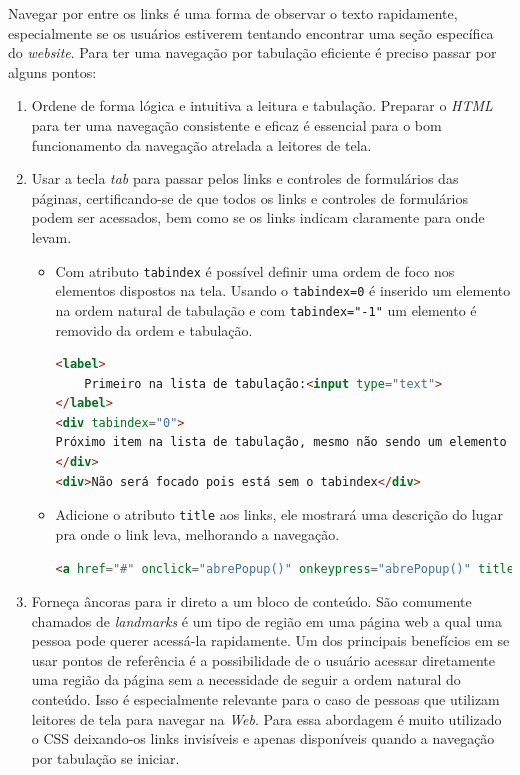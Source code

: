 {{{Navegar por entre os links é uma forma de observar o texto rapidamente, especialmente se os usuários estiverem tentando encontrar uma seção específica do \textit{website}. Para ter uma navegação por tabulação eficiente é preciso passar por alguns pontos: 
\begin{enumerate}
    \item Ordene de forma lógica e intuitiva a leitura e tabulação. Preparar o \textit{HTML}\cite{HTML} para ter uma navegação consistente e eficaz é essencial para o bom funcionamento da navegação atrelada a leitores de tela. 
    \item Usar a tecla \textit{tab} para passar pelos links e controles de formulários
    das páginas, certificando-se de que todos os links e controles de
    formulários podem ser acessados, bem como se os links indicam
    claramente para onde levam. 
    \begin{itemize}
        \item Com atributo \lstinline{tabindex} é possível definir uma ordem de foco nos elementos dispostos na tela. Usando o \lstinline{tabindex=0} é inserido um elemento na ordem natural de tabulação e com \lstinline{tabindex="-1"} um elemento é removido da ordem e tabulação.
        \newpage
{\begin{lstlisting}[language=html,caption=Uso do atributo tabindex]
<label>
    Primeiro na lista de tabulação:<input type="text">
</label>
<div tabindex="0">
Próximo item na lista de tabulação, mesmo não sendo um elemento que receberia o foco natural
</div>
<div>Não será focado pois está sem o tabindex</div>
\end{lstlisting}}
        \item Adicione o atributo \lstinline{title} aos links, ele mostrará uma descrição do lugar pra onde o link leva, melhorando a navegação.
{\begin{lstlisting}[language=html,caption=usando o atributo title]
<a href="#" onclick="abrePopup()" onkeypress="abrePopup()" title="Abre uma janela pop-up com Javascript">Ver mais informações</a>
\end{lstlisting}}
    \end{itemize}
    \item Forneça âncoras para ir direto a um bloco de conteúdo. São comumente chamados de \textit{landmarks} é um tipo de região em uma página web a qual uma pessoa pode querer acessá-la rapidamente. Um dos principais benefícios em se usar pontos de referência é a possibilidade de o usuário acessar diretamente uma região da página sem a necessidade de seguir a ordem natural do conteúdo. Isso é especialmente relevante para o caso de pessoas que utilizam leitores de tela para navegar na \textit{Web}. Para essa abordagem é muito utilizado o CSS \cite{CSS} deixando-os links invisíveis e apenas disponíveis quando a navegação por tabulação se iniciar. 

\end{enumerate}}}}
